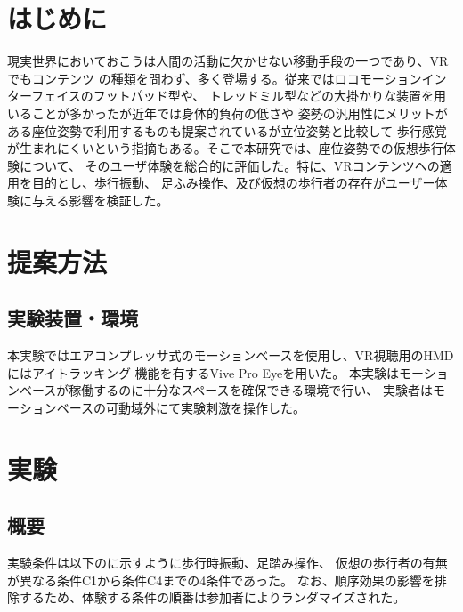 \documentclass[uplatex]{jsarticle}   %
\begin{document}

\vspace{3mm}

\setcounter{page}{x}



\section{はじめに}
現実世界においておこうは人間の活動に欠かせない移動手段の一つであり、VRでもコンテンツ
の種類を問わず、多く登場する。従来ではロコモーションインターフェイスのフットパッド型や、
トレッドミル型などの大掛かりな装置を用いることが多かったが近年では身体的負荷の低さや
姿勢の汎用性にメリットがある座位姿勢で利用するものも提案されているが立位姿勢と比較して
歩行感覚が生まれにくいという指摘もある。そこで本研究では、座位姿勢での仮想歩行体験について、
そのユーザ体験を総合的に評価した。特に、VRコンテンツへの適用を目的とし、歩行振動、
足ふみ操作、及び仮想の歩行者の存在がユーザー体験に与える影響を検証した。

\section{提案方法}
\subsection{実験装置・環境}
本実験ではエアコンプレッサ式のモーションベースを使用し、VR視聴用のHMDにはアイトラッキング
機能を有するVive Pro Eyeを用いた。
本実験はモーションベースが稼働するのに十分なスペースを確保できる環境で行い、
実験者はモーションベースの可動域外にて実験刺激を操作した。

\section{実験}
\subsection{概要}
実験条件は以下のに示すように歩行時振動、足踏み操作、
仮想の歩行者の有無が異なる条件C1から条件C4までの4条件であった。
なお、順序効果の影響を排除するため、体験する条件の順番は参加者によりランダマイズされた。
\end{document}
